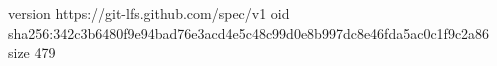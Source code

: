 version https://git-lfs.github.com/spec/v1
oid sha256:342c3b6480f9e94bad76e3acd4e5c48c99d0e8b997dc8e46fda5ac0c1f9c2a86
size 479
